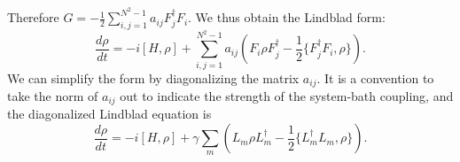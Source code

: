 \documentclass{SciPost}
\begin{document}
Therefore $G = -\frac{1}{2}\sum_{i,j=1}^{N^2-1}a_{ij}F_j^\dagger F_i$. We thus obtain the Lindblad form:
\begin{equation}
	\frac{d\rho}{dt} = -i[H,\rho]+\sum_{i,j=1}^{N^2-1}a_{ij} \left(F_i\rho F_j^\dagger-\frac{1}{2}\{F_j^\dagger F_i, \rho\} \right).
\end{equation}
We can simplify the form by diagonalizing the matrix $a_{ij}$. It is a convention to take the norm of $a_{ij}$ out to indicate the strength of the system-bath coupling, and the diagonalized Lindblad equation is
\begin{equation}\label{eq:lindbladian}
	\frac{d\rho}{dt} = -i[H,\rho]+ \gamma\sum_{m} \left(L_m\rho L_m^\dagger-\frac{1}{2}\{L_m^\dagger L_m, \rho\} \right).
\end{equation}
\end{document}
